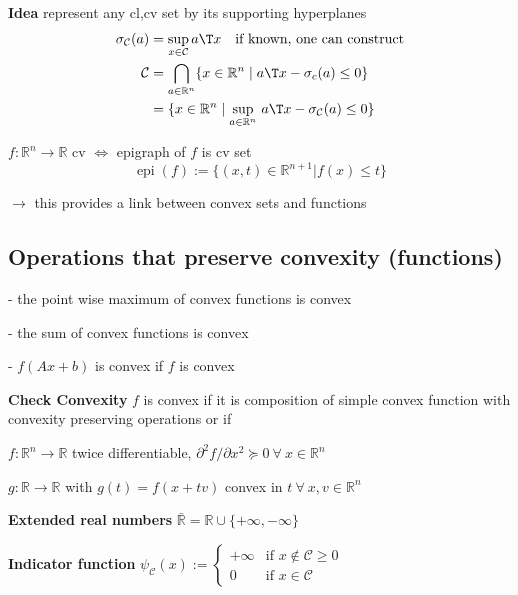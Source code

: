 \textbf{Idea} represent any cl,cv set by its supporting hyperplanes
\[\begin{aligned}
		\sigma_\mathcal{C}(a) & = \sup_{x \in \mathcal{C}}a\T x
		\quad\text{if known, one can construct}                                                                                                        \\
		\mathcal{C}           & = \bigcap_{a \in \mathbb{R}^n} \{x \in \mathbb{R}^n \mid a\T x - \sigma_c(a) \leq 0\}                                  \\
		                      & = \{x \in \mathbb{R}^n \mid \underset{a \in \mathbb{R}^{n}}{\operatorname{sup}}\ a\T x - \sigma_\mathcal{C}(a) \le 0\}
	\end{aligned}\]

\begin{definition}
	$f:\mathbb{R}^n \rightarrow \mathbb{R}$ cv
	$\Leftrightarrow$
	epigraph of $f$ is cv set
	$$\operatorname{epi}(f):=\{(x,t)\in \mathbb{R}^{n+1} | f(x)\le t\}$$
\end{definition}

$\rightarrow$ this provides a link between convex sets and functions

\subsection{Operations that preserve convexity (functions)}

- the point wise maximum of convex functions is convex

- the sum of convex functions is convex

- $f(Ax+b)$ is convex if $f$ is convex

\textbf{Check Convexity} $f$ is convex if it is
composition of simple convex function
with convexity preserving operations
or if

$f: \mathbb{R}^n \rightarrow \mathbb{R}$ twice differentiable,
$\partial^2f/\partial x^2 \succeq 0\ \forall\ x \in \mathbb{R}^{n}$

$g: \mathbb{R} \rightarrow \mathbb{R}$ with $g(t)=f(x+tv)$
convex in $t\ \forall\ x,v \in \mathbb{R}^{n}$



\textbf{Extended real numbers} $\bar{\mathbb{R}} = \mathbb{R} \cup \{+\infty, -\infty\}$


\textbf{Indicator function}
$\psi_\mathcal{C}(x) := \begin{cases} +\infty &\text{if } x \notin\mathcal{C} \ge 0 \\ 0 &\text{if } x \in\mathcal{C} \end{cases}$

